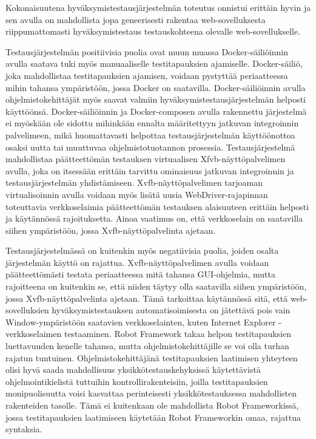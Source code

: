   Kokonaisuutena hyväksymistestausjärjestelmän toteutus onnistui erittäin hyvin ja sen avulla on mahdollista jopa geneerisesti rakentaa web-sovelluksesta riippumattomasti hyväksymistestaus testauskohteena olevalle web-sovellukselle.

  Testausjärjestelmän positiivisia puolia ovat muun muassa Docker-säiliöinnin avulla saatava tuki myös manuaaliselle testitapauksien ajamiselle.
  Docker-säiliö, joka mahdollistaa testitapauksien ajamisen, voidaan pystyttää periaatteessa mihin tahansa ympäristöön, jossa Docker on saatavilla.
  Docker-säiliöinnin avulla ohjelmistokehittäjät myös saavat valmiin hyväksymistestausjärjestelmän helposti käyttöönsä.
  Docker-säiliöinnin ja Docker-composen avulla rakennettu järjestelmä ei myöskään ole sidottu mihinkään ennalta määritettyyn jatkuvan integroinnin palvelimeen, mikä huomattavasti helpottaa testausjärjestelmän käyttöönottoa osaksi uutta tai muuttuvaa ohjelmistotuotannon prosessia.
  Testausjärjestelmä mahdollistaa päätteettömän testauksen virtuaalisen Xfvb-näyttöpalvelimen avulla, joka on itsessään erittäin tarvittu ominaisuus jatkuvan integroinnin ja testausjärjestelmän yhdistämiseen.
  Xvfb-näyttöpalvelimen tarjoaman virtualisoinnin avulla voidaan myös lisätä uusia WebDriver-rajapinnan toteuttavia verkkoselaimia päätteettömän testauksen alaisuuteen erittäin helposti ja käytännössä rajoituksetta.
  Ainoa vaatimus on, että verkkoselain on saatavilla siihen ympäristöön, jossa Xvfb-näyttöpalvelinta ajetaan.

  Testausjärjestelmässä on kuitenkin myös negatiivisia puolia, joiden osalta järjestelmän käyttö on rajattua.
  Xvfb-näyttöpalvelimen avulla voidaan päätteettömästi testata periaatteessa mitä tahansa GUI-ohjelmia, mutta rajoitteena on kuitenkin se, että niiden täytyy olla saatavilla siihen ympäristöön, jossa Xvfb-näyttöpalvelinta ajetaan.
  Tämä tarkoittaa käytännössä sitä, että web-sovelluksien hyväksymistestauksen automatisoimisesta on jätettävä pois vain Window-ympäristöön saatavien verkkoselainten, kuten Internet Explorer -verkkoselaimen testaaminen.
  Robot Framework takaa helpon testitapauksien luettavuuden kenelle tahansa, mutta ohjelmistokehittäjille se voi olla turhan rajatun tuntuinen.
  Ohjelmistokehittäjänä testitapauksien laatimisen yhteyteen olisi hyvä saada mahdollisuus yksikkötestauskehyksissä käytettävistä ohjelmointikielistä tuttuihin kontrollirakenteisiin, joilla testitapauksien monipuolisuutta voisi kasvattaa perinteisesti yksikkötestauksessa mahdollisten rakenteiden tasolle.
  Tämä ei kuitenkaan ole mahdollista Robot Frameworkissä, jossa testitapauksien laatimiseen käytetään Robot Frameworkin omaa, rajattua syntaksia.

